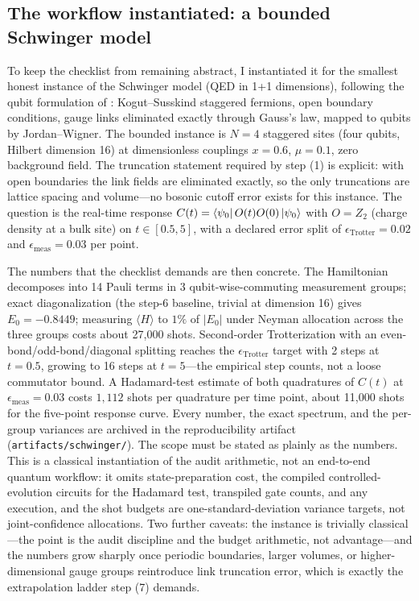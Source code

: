 \subsection{The workflow instantiated: a bounded Schwinger model}

To keep the checklist from remaining abstract, I instantiated it for the smallest honest instance of the Schwinger model (QED in 1+1 dimensions), following the qubit formulation of \citet{klco2018}: Kogut--Susskind staggered fermions, open boundary conditions, gauge links eliminated exactly through Gauss's law, mapped to qubits by Jordan--Wigner. The bounded instance is $N=4$ staggered sites (four qubits, Hilbert dimension 16) at dimensionless couplings $x=0.6$, $\mu=0.1$, zero background field. The truncation statement required by step (1) is explicit: with open boundaries the link fields are eliminated exactly, so the only truncations are lattice spacing and volume---no bosonic cutoff error exists for this instance. The question is the real-time response $C(t)=\left\langle\psi_0\right|O(t)O(0)\left|\psi_0\right\rangle$ with $O=Z_{2}$ (charge density at a bulk site) on $t\in[0.5,5]$, with a declared error split of $\epsilon_{\mathrm{Trotter}}=0.02$ and $\epsilon_{\mathrm{meas}}=0.03$ per point.

The numbers that the checklist demands are then concrete. The Hamiltonian decomposes into 14 Pauli terms in 3 qubit-wise-commuting measurement groups; exact diagonalization (the step-6 baseline, trivial at dimension 16) gives $E_0=-0.8449$; measuring $\langle H\rangle$ to $1\%$ of $|E_0|$ under Neyman allocation across the three groups costs about 27{,}000 shots. Second-order Trotterization with an even-bond/odd-bond/diagonal splitting reaches the $\epsilon_{\mathrm{Trotter}}$ target with 2 steps at $t=0.5$, growing to 16 steps at $t=5$---the empirical step counts, not a loose commutator bound. A Hadamard-test estimate of both quadratures of $C(t)$ at $\epsilon_{\mathrm{meas}}=0.03$ costs $1{,}112$ shots per quadrature per time point, about 11{,}000 shots for the five-point response curve. Every number, the exact spectrum, and the per-group variances are archived in the reproducibility artifact (\texttt{artifacts/schwinger/}). The scope must be stated as plainly as the numbers. This is a classical instantiation of the audit arithmetic, not an end-to-end quantum workflow: it omits state-preparation cost, the compiled controlled-evolution circuits for the Hadamard test, transpiled gate counts, and any execution, and the shot budgets are one-standard-deviation variance targets, not joint-confidence allocations. Two further caveats: the instance is trivially classical---the point is the audit discipline and the budget arithmetic, not advantage---and the numbers grow sharply once periodic boundaries, larger volumes, or higher-dimensional gauge groups reintroduce link truncation error, which is exactly the extrapolation ladder step (7) demands.
